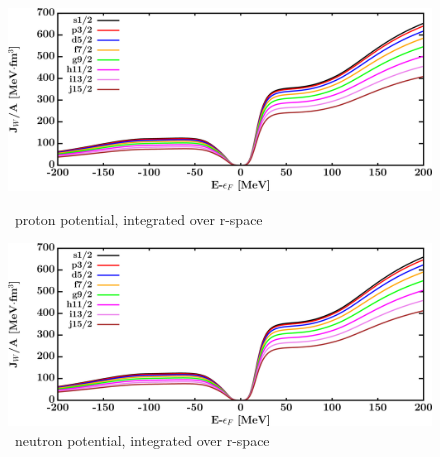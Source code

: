 \begin{figure}[H]
    \centering
    \begin{minipage}{0.45\textwidth}
        \centering
        \includegraphics[width=1.0\textwidth]{figures/ca40_protonVolumeIntegrals.png}
        \caption{\caForty\ proton potential, integrated over r-space}
        \label{DOMFitData_ca40_proton_potentialIntegral}
    \end{minipage}\hfill
    \begin{minipage}{0.45\textwidth}
        \centering
        \includegraphics[width=1.0\textwidth]{figures/ca40_neutronVolumeIntegrals.png}
        \caption{\caForty\ neutron potential, integrated over r-space}
        \label{DOMFitData_ca40_neutron_potentialIntegral}
    \end{minipage}
\end{figure}

\afterpage{\clearpage}

